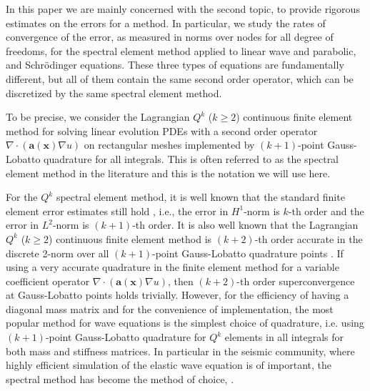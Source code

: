 \documentclass[onefignum,onetabnum]{siamart171218}
\begin{document}
In this paper we are mainly concerned with the second topic, to provide rigorous estimates on the errors for a method. In particular, we study the rates of convergence of the error,  as measured in norms over nodes for all degree of freedoms, for the spectral element method applied to linear wave and parabolic, and   Schr\"{o}dinger equations. { These three types of equations are fundamentally different, but all of them contain the same second order operator, which can be discretized by the same spectral element method. }

To be precise, we consider the  Lagrangian $Q^k$ ($k\geq 2$) continuous finite element method for solving linear evolution PDEs with a second order operator $\nabla\cdot (\mathbf a(\mathbf x)\nabla u)$ on rectangular meshes implemented by $(k+1)$-point Gauss-Lobatto quadrature for all integrals. This is often referred to as the spectral element method in the literature and this is the notation we will use here. 

For the $Q^k$ spectral element method, it is well known that the standard finite element error estimates  still hold \cite{maday1990optimal}, 
i.e., the error in $H^1$-norm is $k$-th order and the error in $L^2$-norm is $(k+1)$-th order. It is also well known that the Lagrangian $Q^k$ ($k\geq 2$) continuous finite element method is $(k+2)$-th order accurate in the discrete 2-norm over all $(k+1)$-point Gauss-Lobatto quadrature points \cite{wahlbin2006superconvergence, lin1996, chen2001structure}. If using a very accurate quadrature in the finite element method for a variable coefficient operator $\nabla\cdot (\mathbf a(\mathbf x)\nabla u)$, then  $(k+2)$-th order superconvergence at Gauss-Lobatto points holds trivially. However, for the efficiency of having a diagonal mass matrix and for the convenience of implementation,  the most popular method for wave equations is the simplest choice of quadrature, i.e. using $(k+1)$-point Gauss-Lobatto quadrature for $Q^k$ elements in all integrals for both mass and stiffness matrices. In particular in the seismic community, where highly efficient simulation of the elastic wave equation is of important, the spectral method has become the method of choice,  \cite{komatitsch1999spectral, komatitsch1999introduction}.
 
\end{document}
